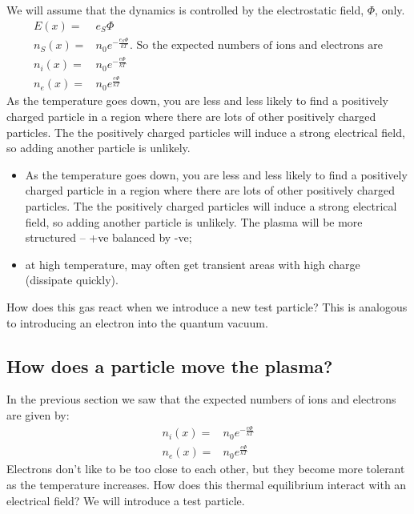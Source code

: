\documentclass[]{article}
\begin{document}
We will assume that the dynamics is controlled by the electrostatic field,  $\Phi$, only.
\begin{align*}
	E(x) =& e_S\Phi\\
	n_S(x)=&n_0 e^{- \frac{e_S\Phi}{kT}} \text{. So the expected numbers of ions  and electrons are}\\
	n_i(x)=&n_0 e^{- \frac{e\Phi}{kT}}\\
	n_e(x)=&n_0 e^{ \frac{e\Phi}{kT}}
\end{align*}
As the temperature goes down, you are less and less likely to find a positively charged particle in a region where there are lots of other positively charged particles. The the positively charged particles will induce a strong electrical field, so adding another particle is unlikely.
\begin{itemize}
	\item As the temperature goes down, you are less and less likely to find a positively charged particle in a region where there are lots of other positively charged particles. The the positively charged particles will induce a strong electrical field, so adding another particle is unlikely. The plasma will be more structured -- +ve balanced by -ve;
	\item at high temperature, may often get transient areas with high charge (dissipate quickly).
\end{itemize}

How does this gas react when we introduce a new test particle? This is analogous to introducing an electron into the quantum vacuum.

\subsection{How does a particle move the plasma?}

In the previous section we saw that the expected numbers of ions  and electrons are given by:
\begin{align*}
	n_i(x)=&n_0 e^{- \frac{e\Phi}{kT}}\\
	n_e(x)=&n_0 e^{ \frac{e\Phi}{kT}}
\end{align*}
Electrons don't like to be too close to each other, but they become more tolerant as the temperature increases. How does this thermal equilibrium interact with an electrical field? We will introduce a test particle.
\end{document}
